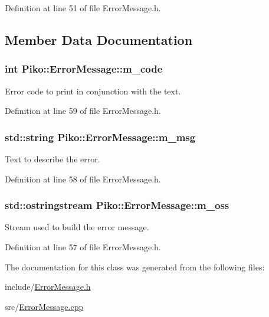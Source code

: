 Definition at line 51 of file Error\-Message.\-h.



\subsection{Member Data Documentation}
\hypertarget{class_piko_1_1_error_message_a44f460d5878ed89dd5f450604bb27ada}{
\subsubsection[{m\-\_\-code}]{\setlength{\rightskip}{0pt plus 5cm}int Piko\-::\-Error\-Message\-::m\-\_\-code\hspace{0.3cm}{\ttfamily [private]}}}\label{d5/d53/class_piko_1_1_error_message_a44f460d5878ed89dd5f450604bb27ada}
Error code to print in conjunction with the text. 

Definition at line 59 of file Error\-Message.\-h.

\hypertarget{class_piko_1_1_error_message_af9c380528847837f27af105e7ccd5e47}{
\subsubsection[{m\-\_\-msg}]{\setlength{\rightskip}{0pt plus 5cm}std\-::string Piko\-::\-Error\-Message\-::m\-\_\-msg\hspace{0.3cm}{\ttfamily [private]}}}\label{d5/d53/class_piko_1_1_error_message_af9c380528847837f27af105e7ccd5e47}
Text to describe the error. 

Definition at line 58 of file Error\-Message.\-h.

\hypertarget{class_piko_1_1_error_message_a14a696b446831809aee6782f68b6dea4}{
\subsubsection[{m\-\_\-oss}]{\setlength{\rightskip}{0pt plus 5cm}std\-::ostringstream Piko\-::\-Error\-Message\-::m\-\_\-oss\hspace{0.3cm}{\ttfamily [private]}}}\label{d5/d53/class_piko_1_1_error_message_a14a696b446831809aee6782f68b6dea4}
Stream used to build the error message. 

Definition at line 57 of file Error\-Message.\-h.



The documentation for this class was generated from the following files\-:\begin{DoxyCompactItemize}
\item 
include/\hyperlink{_error_message_8h}{Error\-Message.\-h}\item 
src/\hyperlink{_error_message_8cpp}{Error\-Message.\-cpp}\end{DoxyCompactItemize}
